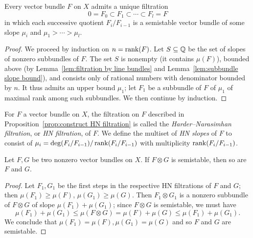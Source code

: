 \begin{proposition} \label{prop:construct HN filtration}
Every vector bundle $F$ on $X$ admits a unique filtration
\[
0 = F_0 \subset F_1 \subset \cdots \subset F_l = F
\]
in which each successive quotient $F_i/F_{i-1}$ is a semistable vector bundle of some slope $\mu_i$ and $\mu_1 > \cdots > \mu_l$.
\end{proposition}
\begin{proof}
We proceed by induction on $n = \operatorname{rank}(F)$.
Let $S \subseteq \mathbb{Q}$ be the set of slopes of nonzero subbundles of $F$.
The set $S$ is nonempty (it contains $\mu(F)$), bounded above
(by Lemma~\ref{lem:filtration by line bundles} and Lemma~\ref{lem:subbundle slope bound}),
and consists only of rational numbers with denominator bounded by $n$.
It thus admits an upper bound $\mu_1$; let $F_1$ be a subbundle of $F$ of $\mu_1$ of maximal rank
among such subbundles.
We then continue by induction.
\end{proof}

\begin{definition} \label{def:HN filtration}
For $F$ a vector bundle on $X$, the filtration on $F$ described in Proposition~\ref{prop:construct HN filtration}
is called the  \emph{Harder--Narasimhan filtration}, or \emph{HN filtration}, of $F$.
We define the multiset of \emph{HN slopes} of $F$ to consist of $\mu_i = \deg(F_i/F_{i-1})/\operatorname{rank}(F_i/F_{i-1})$ with multiplicity $\operatorname{rank}(F_i/F_{i-1})$.
\end{definition}

\begin{lemma} \label{lem:semistable from product}
Let $F,G$ be two nonzero vector bundles on $X$. If $F \otimes G$ is semistable, then so are $F$ and $G$.
\end{lemma}
\begin{proof}
Let $F_1, G_1$ be the first steps in the respective HN filtrations of $F$ and $G$;
then $\mu(F_1) \geq \mu(F)$, $\mu(G_1) \geq \mu(G)$. 
Then $F_1 \otimes G_1$ is a nonzero subbundle of $F \otimes G$ of slope $\mu(F_1)+\mu(G_1)$; since
$F \otimes G$ is semistable, we must have 
\[
\mu(F_1)+\mu(G_1) \leq \mu(F \otimes G) = \mu(F) + \mu(G) \leq \mu(F_1) + \mu(G_1).
\]
We conclude that $\mu(F_1) = \mu(F), \mu(G_1) = \mu(G)$ and so $F$ and $G$ are semistable.
\end{proof}

